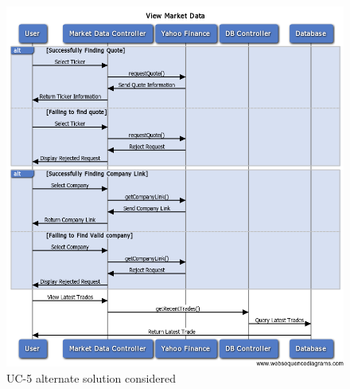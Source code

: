 \begin{figure}[H]
\centering
\includegraphics[width=5.5in]{./img/inter/alt5.png}
\caption{UC-5 alternate solution considered}
\end{figure}
